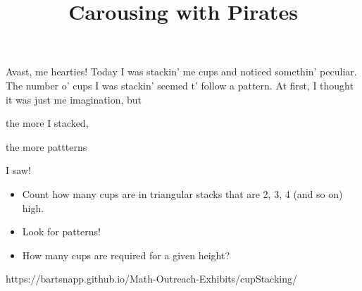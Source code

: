 \documentclass{../exhibit}
\title{Carousing with Pirates}
\begin{document}
\begin{context}
  Avast, me hearties! Today I was stackin' me cups and noticed
  somethin' peculiar.
  \\[1cm]
  The number o' cups I was stackin' seemed t'
  follow a pattern. At first, I thought it was just me imagination,
  but

  the more I stacked,

  \qquad\qquad the more pattterns


  \hfill  I saw!
\end{context}

\begin{directions}
  \begin{itemize}
    \item Count how many cups are in triangular stacks that are 2, 3,
      4 (and so on) high.
    \item Look for patterns!
    \item How many cups are required for a given height?
  \end{itemize}
\end{directions}

\begin{example}

\hfill
{}
\hfill
{}
\hfill
{}
\end{example}

\begin{mathConnections}
  https://bartsnapp.github.io/Math-Outreach-Exhibits/cupStacking/
\end{mathConnections}
\end{document}
